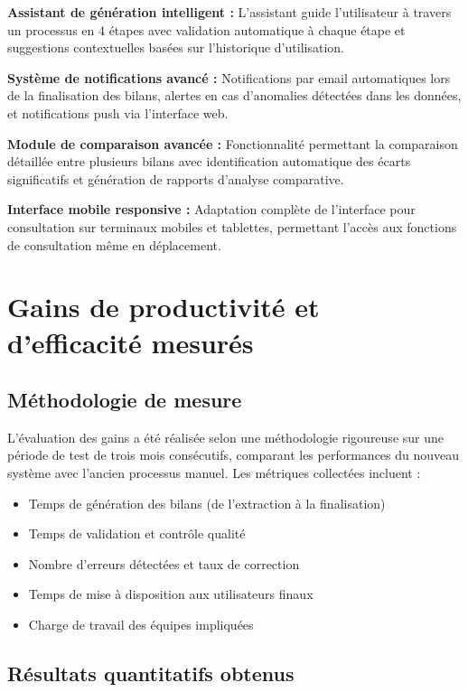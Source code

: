 \textbf{Assistant de génération intelligent :}
L'assistant guide l'utilisateur à travers un processus en 4 étapes avec validation automatique à chaque étape et suggestions contextuelles basées sur l'historique d'utilisation.

\textbf{Système de notifications avancé :}
Notifications par email automatiques lors de la finalisation des bilans, alertes en cas d'anomalies détectées dans les données, et notifications push via l'interface web.

\textbf{Module de comparaison avancée :}
Fonctionnalité permettant la comparaison détaillée entre plusieurs bilans avec identification automatique des écarts significatifs et génération de rapports d'analyse comparative.

\textbf{Interface mobile responsive :}
Adaptation complète de l'interface pour consultation sur terminaux mobiles et tablettes, permettant l'accès aux fonctions de consultation même en déplacement.

\section{Gains de productivité et d'efficacité mesurés}

\subsection{Méthodologie de mesure}

L'évaluation des gains a été réalisée selon une méthodologie rigoureuse sur une période de test de trois mois consécutifs, comparant les performances du nouveau système avec l'ancien processus manuel. Les métriques collectées incluent :

\medskip

\begin{itemize}
    \item Temps de génération des bilans (de l'extraction à la finalisation)
    \item Temps de validation et contrôle qualité
    \item Nombre d'erreurs détectées et taux de correction
    \item Temps de mise à disposition aux utilisateurs finaux
    \item Charge de travail des équipes impliquées
\end{itemize}

\subsection{Résultats quantitatifs obtenus}

